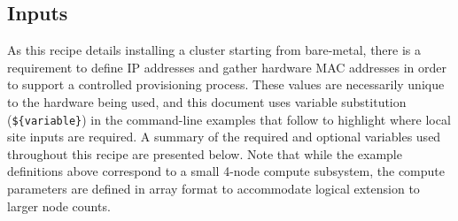 
\subsection{Inputs} \label{sec:inputs}
As this recipe details installing a cluster starting from bare-metal, there is a requirement to define IP addresses and  gather hardware MAC addresses in order to support a controlled provisioning process. These values are necessarily unique to the hardware being used, and this document uses variable substitution (\texttt{\$\{variable\}}) in the command-line examples that follow to highlight where local site inputs are required. 
A summary of the required and optional variables
used throughout this recipe are presented below. Note that while the example definitions above correspond to a small 4-node compute subsystem, the compute parameters are defined in array format to accommodate logical extension to larger node counts. 

